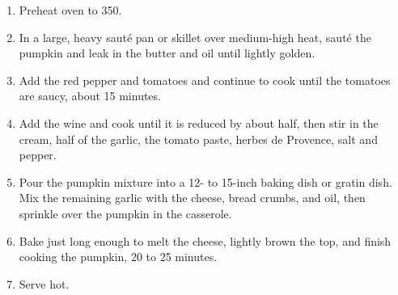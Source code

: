 
\begin{ingredients}
\end{ingredients}


\begin{recipe}
  \begin{enumerate}

  \item Preheat oven to 350\F.

  \item In a large, heavy saut\'e pan or skillet over medium-high
    heat, saut\'e the pumpkin and leak in the butter and oil until
    lightly golden.

  \item Add the red pepper and tomatoes and continue to cook until the
    tomatoes are saucy, about 15 minutes.

  \item Add the wine and cook until it is reduced by about half, then
    stir in the cream, half of the garlic, the tomato paste, herbes de
    Provence, salt and pepper.

  \item Pour the pumpkin mixture into a 12- to 15-inch baking dish or
    gratin dish.  Mix the remaining garlic with the cheese, bread
    crumbs, and oil, then sprinkle over the pumpkin in the casserole.

  \item Bake just long enough to melt the cheese, lightly brown the
    top, and finish cooking the pumpkin, 20 to 25 minutes.

  \item Serve hot.

  \end{enumerate}
\end{recipe}
